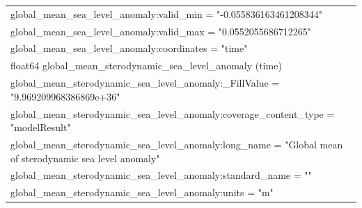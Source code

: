 \begin{longtable}{|p{\textwidth}|}
\hspace{0.5cm}\hspace{0.5cm}global\_mean\_sea\_level\_anomaly:valid\_min = "-0.055836163461208344"\\
\hspace{0.5cm}\hspace{0.5cm}global\_mean\_sea\_level\_anomaly:valid\_max = "0.0552055686712265"\\
\hspace{0.5cm}\hspace{0.5cm}global\_mean\_sea\_level\_anomaly:coordinates = "time"\\
\hspace{0.5cm}float64 global\_mean\_sterodynamic\_sea\_level\_anomaly (time)\\
\hspace{0.5cm}\hspace{0.5cm}global\_mean\_sterodynamic\_sea\_level\_anomaly:\_FillValue = "9.969209968386869e+36"\\
\hspace{0.5cm}\hspace{0.5cm}global\_mean\_sterodynamic\_sea\_level\_anomaly:coverage\_content\_type = "modelResult"\\
\hspace{0.5cm}\hspace{0.5cm}global\_mean\_sterodynamic\_sea\_level\_anomaly:long\_name = "Global mean of sterodynamic sea level anomaly"\\
\hspace{0.5cm}\hspace{0.5cm}global\_mean\_sterodynamic\_sea\_level\_anomaly:standard\_name = ""\\
\hspace{0.5cm}\hspace{0.5cm}global\_mean\_sterodynamic\_sea\_level\_anomaly:units = "m"\\

\end{longtable}
